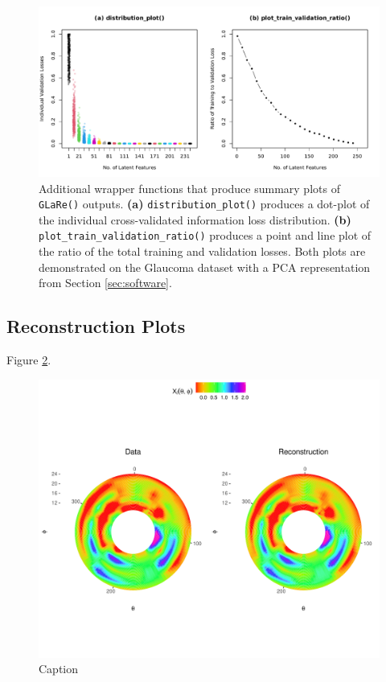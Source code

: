 \begin{figure}
    \centering
    \includegraphics[width=1\linewidth]{figures/additional-plots-01.pdf}
    \caption{Additional wrapper functions that produce summary plots of \texttt{GLaRe()} outputs. \textbf{(a)} \texttt{distribution\_plot()} produces a dot-plot of the individual cross-validated information loss distribution. \textbf{(b)} \texttt{plot\_train\_validation\_ratio()} produces a point and line plot of the ratio of the total training and validation losses.
    Both plots are demonstrated on the Glaucoma dataset with a PCA representation from Section \ref{sec:software}.}
    \label{fig:additional-plots-01}
\end{figure}

\subsection{Reconstruction Plots}

Figure \ref{fig:eye-reconstruction}.

\begin{figure}
    \centering
    \includegraphics[width=0.75\linewidth]{figures/eye-reconstruction.pdf}
    \caption{Caption}
    \label{fig:eye-reconstruction}
\end{figure}
